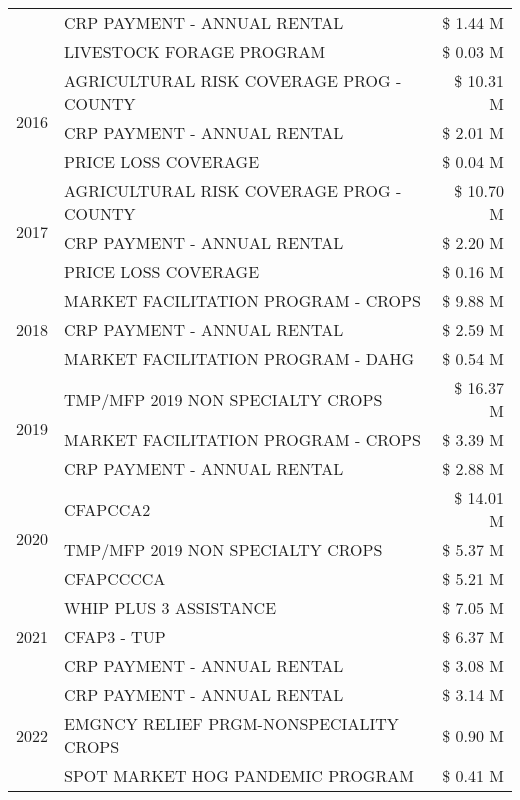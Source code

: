 \begin{tabular}{llr}
 & CRP PAYMENT - ANNUAL RENTAL & \$ 1.44 M \\
 & LIVESTOCK FORAGE PROGRAM & \$ 0.03 M \\
\cline{1-3}
\multirow[t]{3}{*}{2016} & AGRICULTURAL RISK COVERAGE PROG - COUNTY & \$ 10.31 M \\
 & CRP PAYMENT - ANNUAL RENTAL & \$ 2.01 M \\
 & PRICE LOSS COVERAGE & \$ 0.04 M \\
\cline{1-3}
\multirow[t]{3}{*}{2017} & AGRICULTURAL RISK COVERAGE PROG - COUNTY & \$ 10.70 M \\
 & CRP PAYMENT - ANNUAL RENTAL & \$ 2.20 M \\
 & PRICE LOSS COVERAGE & \$ 0.16 M \\
\cline{1-3}
\multirow[t]{3}{*}{2018} & MARKET FACILITATION PROGRAM - CROPS & \$ 9.88 M \\
 & CRP PAYMENT - ANNUAL RENTAL & \$ 2.59 M \\
 & MARKET FACILITATION PROGRAM - DAHG & \$ 0.54 M \\
\cline{1-3}
\multirow[t]{3}{*}{2019} & TMP/MFP 2019 NON SPECIALTY CROPS & \$ 16.37 M \\
 & MARKET FACILITATION PROGRAM - CROPS & \$ 3.39 M \\
 & CRP PAYMENT - ANNUAL RENTAL & \$ 2.88 M \\
\cline{1-3}
\multirow[t]{3}{*}{2020} & CFAPCCA2 & \$ 14.01 M \\
 & TMP/MFP 2019 NON SPECIALTY CROPS & \$ 5.37 M \\
 & CFAPCCCCA & \$ 5.21 M \\
\cline{1-3}
\multirow[t]{3}{*}{2021} & WHIP PLUS 3 ASSISTANCE & \$ 7.05 M \\
 & CFAP3 - TUP & \$ 6.37 M \\
 & CRP PAYMENT - ANNUAL RENTAL & \$ 3.08 M \\
\cline{1-3}
\multirow[t]{3}{*}{2022} & CRP PAYMENT - ANNUAL RENTAL & \$ 3.14 M \\
 & EMGNCY RELIEF PRGM-NONSPECIALITY CROPS & \$ 0.90 M \\
 & SPOT MARKET HOG PANDEMIC PROGRAM & \$ 0.41 M \\
\cline{1-3}
\bottomrule
\end{tabular}
